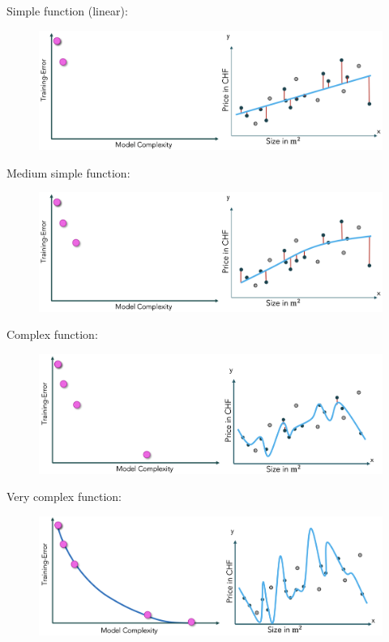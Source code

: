 \documentclass[a4paper]{extarticle}
\begin{document}
Simple function (linear):

\begin{figure}[H]
    \includegraphics[width=15cm]{../images/IntroML_Fig3-7}
    \centering
\end{figure}

Medium simple function:

\begin{figure}[H]
    \includegraphics[width=15cm]{../images/IntroML_Fig3-8}
    \centering
\end{figure}

Complex function:

\begin{figure}[H]
    \includegraphics[width=15cm]{../images/IntroML_Fig3-9}
    \centering
\end{figure}

Very complex function:

\begin{figure}[H]
    \includegraphics[width=15cm]{../images/IntroML_Fig3-10}
    \centering
\end{figure}
\end{document}
